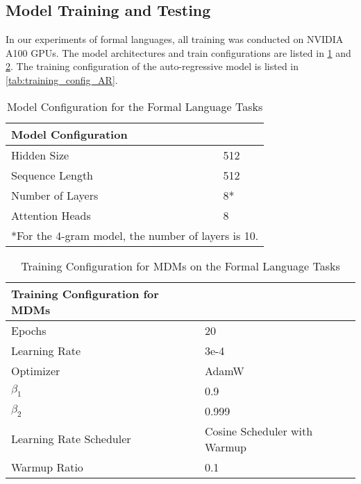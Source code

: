 \subsection{Model Training and Testing}
\label{app:train}
In our experiments of formal languages, all training was conducted on NVIDIA A100 GPUs. The model architectures and train configurations are listed in \cref{tab:model_config} and \cref{tab:training_config}. The training configuration of the auto-regressive model is listed in \cref{tab:training_config_AR}.
\begin{table}[H]
    \centering
    \begin{tabular}{ll}
      \toprule
    {\centering \textbf{Model Configuration} }\\
    \midrule
        Hidden Size & 512 \\
        Sequence Length & 512 \\
        Number of Layers & 8* \\
        Attention Heads & 8 \\
        \bottomrule
        \multicolumn{2}{l}{*For the 4-gram model, the number of layers is 10.}
    \end{tabular}

    \caption{Model Configuration for the Formal Language Tasks}
    \label{tab:model_config}
\end{table}

\begin{table}[H]
    \centering
    \begin{tabular}{ll}
      \toprule
    {\centering \textbf{Training Configuration for MDMs} }\\
    \midrule
        Epochs & 20\\
        Learning Rate & 3e-4 \\
        Optimizer & AdamW \\
        $\beta_1$ & 0.9 \\
        $\beta_2$ & 0.999 \\
        Learning Rate Scheduler & Cosine Scheduler with Warmup \\
        Warmup Ratio & 0.1 \\
        \bottomrule
    \end{tabular}
    \caption{Training Configuration for MDMs on the Formal Language Tasks}
    \label{tab:training_config}
\end{table}

